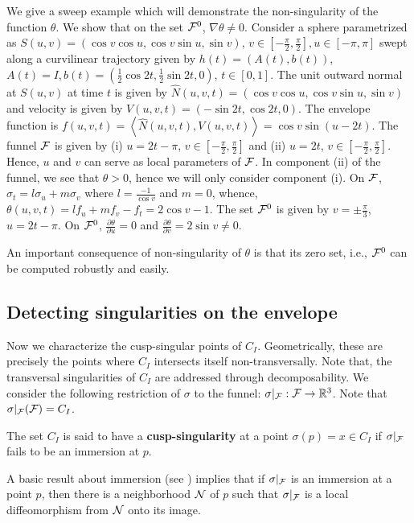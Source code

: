 \documentclass{elsart5p}
\begin{document}
We give a sweep example which will demonstrate the non-singularity of the function $\theta$.  We show 
that on the set ${\cal F}^0$, $\nabla \theta \neq 0$.
Consider a sphere parametrized as $S(u,v) = (\cos v \cos u, \cos v \sin u, \sin v)$, $v \in [-\frac{\pi}{2}, \frac{\pi}{2}], u \in [-\pi, \pi]$  
swept along a curvilinear trajectory given by $h(t) = (A(t), b(t))$, $A(t) = I, b(t) = (\frac{1}{2} \cos 2t, \frac{1}{2} \sin 2t, 0)$, $t\in [0,1]$.
The unit outward normal at $S(u,v)$ at time $t$ is given by $\hat{N}(u,v,t) = (\cos v \cos u, \cos v \sin u, \sin v)$ and velocity is given by 
$V(u,v,t) = (-\sin 2t, \cos 2t, 0)$.  The envelope function is $f(u,v,t) = \left < \hat{N}(u,v,t) , V(u,v,t) \right > = \cos v \sin (u - 2t)$.  The 
funnel ${\cal F}$ is given by (i) $u = 2t - \pi$, $v \in [-\frac{\pi}{2}, \frac{\pi}{2}]$ and (ii) $u = 2t$, $v \in [-\frac{\pi}{2}, \frac{\pi}{2}]$.  
Hence, $u$ and $v$ can serve as local parameters of ${\cal F}$.  In component (ii) of the funnel, we see that 
 $\theta >0$, hence we will only 
consider component (i).  On ${\cal F}$, $\sigma_t = l \sigma_u + m \sigma_v$ where
$l = \frac{-1}{\cos v}$ and $m = 0$, whence, $\theta(u,v,t) = l f_u + m f_v - f_t = 2 \cos v - 1$.  The set 
${\cal F}^0$ is given by $v = \pm \frac{\pi}{3}$, $u = 2t - \pi$.  
On ${\cal F}^0$, $\frac{\partial \theta}{\partial u} = 0$ 
and $\frac{\partial \theta}{\partial v} = 2 \sin v \neq 0$.   

An important consequence of non-singularity of $\theta$ is that its zero set, i.e., ${\cal F}^0$ 
can be computed robustly and easily.

\subsection{Detecting singularities on the envelope} \label{singSec}

Now we characterize the cusp-singular points of $C_I$. Geometrically, these
are precisely the points where $C_I$ intersects itself non-transversally.
Note that, the transversal singularities of $C_I$ are addressed through
decomposability.
We consider the following restriction of $\sigma$ to the funnel:
$\sigma|_{\cal F}: {\cal F} \rightarrow {\mathbb R}^3$.
Note that $\sigma|_{\cal F}({\cal F})=C_I$.

\begin{defn} \label{singDef}
The set $C_I$ is said to have a {\bf cusp-singularity} at a point $\sigma(p)= x \in C_I$ if 
$\sigma|_{{\cal F}}$ fails to be an immersion at $p$. 
\end{defn}
A basic result about immersion (see \cite{diffTop}) implies that 
if $\sigma|_{\cal F}$ is an immersion at a point $p$, then there is a neighborhood ${\cal N}$ of $p$ such
that $\sigma|_{\cal F}$ is a local diffeomorphism from ${\cal N}$ onto
its image.
\end{document}
